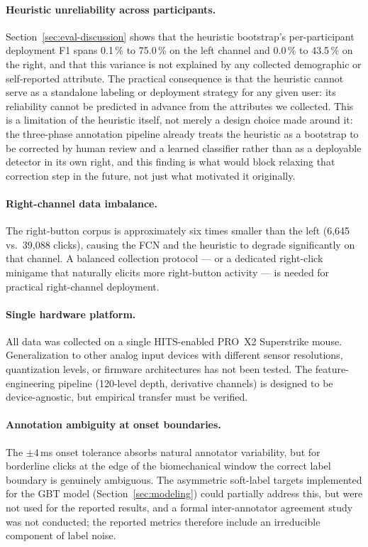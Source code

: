 \paragraph{Heuristic unreliability across participants.}
Section~\ref{sec:eval-discussion} shows that the heuristic bootstrap's per-participant
deployment F1 spans 0.1\,\% to 75.0\,\% on the left channel and 0.0\,\% to 43.5\,\% on
the right, and that this variance is not explained by any collected demographic or
self-reported attribute. The practical consequence is that the
heuristic cannot serve as a standalone labeling or deployment strategy for any given
user: its reliability cannot be predicted in advance from the attributes we
collected. This is a limitation of the heuristic itself, not merely a design
choice made around it: the three-phase annotation pipeline already treats the
heuristic as a bootstrap to be corrected by human review and a learned classifier
rather than as a deployable detector in its own right, and this finding is what
would block relaxing that correction step in the future, not just what motivated
it originally.

\paragraph{Right-channel data imbalance.}
The right-button corpus is approximately six times smaller than the left (6,645 vs.\
39,088 clicks), causing the FCN and the heuristic to degrade significantly on that
channel.  A balanced collection protocol --- or a dedicated right-click minigame that
naturally elicits more right-button activity --- is needed for practical
right-channel deployment.

\paragraph{Single hardware platform.}
All data was collected on a single HITS-enabled PRO~X2 Superstrike mouse.
Generalization to other analog input devices with different sensor resolutions,
quantization levels, or firmware architectures has not been tested.  The
feature-engineering pipeline (120-level depth, derivative channels) is designed to
be device-agnostic, but empirical transfer must be verified.

\paragraph{Annotation ambiguity at onset boundaries.}
The $\pm 4$\,ms onset tolerance absorbs natural annotator variability, but for
borderline clicks at the edge of the biomechanical window the correct label boundary
is genuinely ambiguous.  The asymmetric soft-label targets implemented for the GBT
model (Section~\ref{sec:modeling}) could partially address this, but were not used
for the reported results, and a formal inter-annotator agreement study was not
conducted; the reported metrics therefore include an irreducible component of
label noise.

